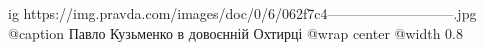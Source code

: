  
 
 
 
 

\ifcmt
  ig https://img.pravda.com/images/doc/0/6/062f7c4---------------------------.jpg
	@caption Павло Кузьменко в довоєнній Охтирці
  @wrap center
  @width 0.8
\fi

